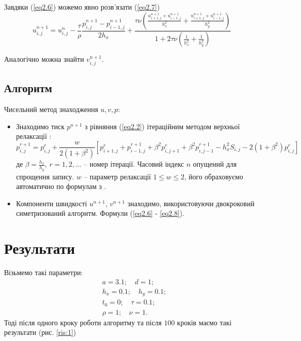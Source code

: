 \documentclass[a4paper,12pt]{article}
\begin{document}
Завдяки (\ref{eq2.6}) можемо явно розв'язати (\ref{eq2.7})
\begin{equation}	\label{eq2.8}
	u^{n+1}_{i,j} = u^{n}_{i,j} - \frac{\tau}{\rho} \frac{p^{n+1}_{i,j} - p^{n+1}_{i-1,j}}{2h_x} + \frac{\tau \nu \left(  \frac{u^{n+1}_{i+1,j}+u^{n+1}_{i-1,j}}{h_x^2} + \frac{u^{n+1}_{i+1,j}+u^{n+1}_{i-1,j}}{h_y^2}\right)}{1 + 2 \tau \nu \left( \frac{1}{h_x^2} + \frac{1}{h_y^2} \right)}
\end{equation}

Аналогічно можна знайти $v_{i,j}^{n+1}$.

\subsection{Алгоритм}

Чисельний метод знаходження $u,v,p$:

\begin{itemize}
	\item Знаходимо тиск $p^{n+1}$ з рівняння (\ref{eq2.2}) ітераційним методом верхньої релаксації \cite[стор.182-183]{Rouch}:
	\begin{equation}\label{eq2.9}
		p^{r+1}_{i,j} = p^{r}_{i,j} + \frac{w}{2(1+\beta^2)} \left[ p^{r}_{i+1,j} + p^{r+1}_{i-1,j} + \beta^2 p^{r}_{i,j+1} + \beta^2 p^{r+1}_{i,j-1} - h_x^2 S_{i,j} - 2(1+ \beta^2) p^{r}_{i,j}\right]
	\end{equation}
	де $\beta = \frac{h_x}{h_y}$, $r = 1,2,\ldots$ -- номер ітерації. Часовий індекс $n$ опущений для спрощення запису. $w$ -- параметр релаксації $1 \le w \le 2$, його обраховуємо автоматично по формулам з \cite{Rouch}.
	\item Компоненти швидкості $u^{n+1}$, $v^{n+1}$ знаходимо, використовуючи двокроковий симетризований алгоритм. Формули (\ref{eq2.6} - \ref{eq2.8}).
\end{itemize}

\section{Результати}

Візьмемо такі параметри:
\[
	\begin{aligned}
		&a = 3.1; \quad d = 1; \\
		&h_x = 0.1; \quad h_y = 0.1;\\
		&t_0 =0; \quad \tau= 0.1;\\
		&\rho =1; \quad \nu = 1.		
	\end{aligned}
\]
Тоді після одного кроку роботи алгоритму та після $100$ кроків маємо такі результати (рис. \ref{ris:1})
\end{document}
